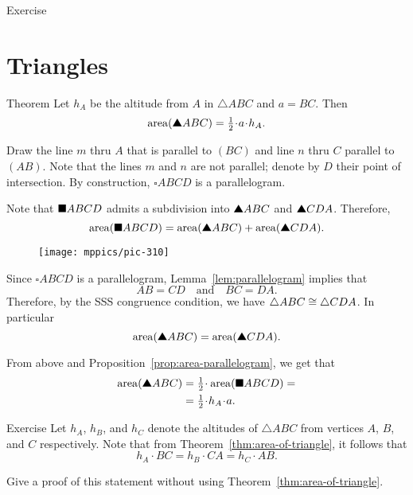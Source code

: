 {{\begin{thm}{Exercise}
\end{thm}

}

\section{Triangles}


\begin{thm}{Theorem}\label{thm:area-of-triangle}
Let $h_A$ be the altitude from $A$
in  $\triangle ABC$ and $a=BC$.
Then 
\[\area(\solidtriangle ABC)=\tfrac12\cdot a\cdot h_A.\]
\end{thm}

Draw the line $m$ thru $A$ that is parallel to $(BC)$
and line $n$ thru $C$ parallel to~$(AB)$.
Note that the lines $m$ and $n$ are not parallel;
denote by $D$ their point of intersection.
By construction, $\square ABCD$ is a parallelogram.

Note that $\blacksquare ABCD$ admits a subdivision into $\solidtriangle ABC$ and $\solidtriangle CDA$.
Therefore, 
\[\area(\solidsquare ABCD)
=
\area(\solidtriangle ABC)
+
\area(\solidtriangle CDA).\]

\begin{wrapfigure}{o}{28 mm}
\centering
\texttt{[image: mppics/pic-310]}
\end{wrapfigure}

Since $\square ABCD$ is a parallelogram,  Lemma~\ref{lem:parallelogram} implies that
\[AB=CD
\quad
\text{and}
\quad
BC=DA.\]
Therefore, by the SSS congruence condition, we have
$\triangle ABC\cong\triangle CDA$.
In particular
\[\area(\solidtriangle ABC)
=
\area(\solidtriangle CDA).\]

From above and Proposition~\ref{prop:area-parallelogram}, we get that
\begin{align*}
\area(\solidtriangle ABC)
&=\tfrac12\cdot\area(\solidsquare ABCD)=
\\
&=\tfrac12\cdot h_A\cdot a.
\end{align*}
\qedsf

\begin{thm}{Exercise}\label{ex:three-trig}
Let $h_A$, $h_B$, and $h_C$ denote the altitudes of $\triangle ABC$ from vertices $A$, $B$, and $C$ respectively.
Note that from Theorem~\ref{thm:area-of-triangle},
it follows that
\[h_A\cdot BC=h_B\cdot CA=h_C\cdot AB.\]

Give a proof of this statement without using Theorem~\ref{thm:area-of-triangle}.
\end{thm}

}
